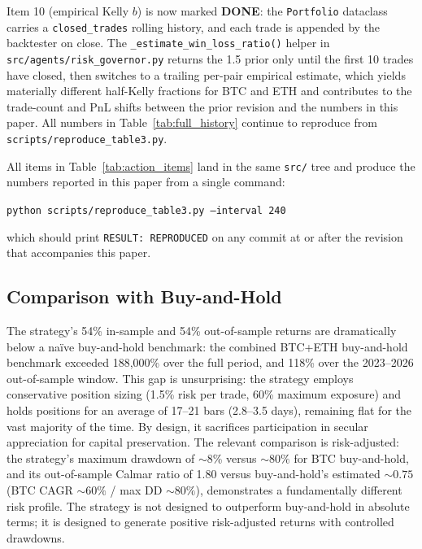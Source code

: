 \documentclass{article}
\begin{document}
Item 10 (empirical Kelly $b$) is now marked \textbf{DONE}: the \texttt{Portfolio} dataclass carries a \texttt{closed\_trades} rolling history, and each trade is appended by the backtester on close. The \texttt{\_estimate\_win\_loss\_ratio()} helper in \texttt{src/agents/risk\_governor.py} returns the 1.5 prior only until the first 10 trades have closed, then switches to a trailing per-pair empirical estimate, which yields materially different half-Kelly fractions for BTC and ETH and contributes to the trade-count and PnL shifts between the prior revision and the numbers in this paper. All numbers in Table~\ref{tab:full_history} continue to reproduce from \texttt{scripts/reproduce\_table3.py}.

All items in Table~\ref{tab:action_items} land in the same \texttt{src/} tree and produce the numbers reported in this paper from a single command:
\begin{center}
\texttt{python scripts/reproduce\_table3.py --interval 240}
\end{center}
which should print \texttt{RESULT: REPRODUCED} on any commit at or after the revision that accompanies this paper.

\subsection{Comparison with Buy-and-Hold}

The strategy's 54\% in-sample and 54\% out-of-sample returns are dramatically below a na\"ive buy-and-hold benchmark: the combined BTC+ETH buy-and-hold benchmark exceeded 188{,}000\% over the full period, and 118\% over the 2023--2026 out-of-sample window.
This gap is unsurprising: the strategy employs conservative position sizing (1.5\% risk per trade, 60\% maximum exposure) and holds positions for an average of 17--21 bars (2.8--3.5 days), remaining flat for the vast majority of the time.
By design, it sacrifices participation in secular appreciation for capital preservation.
The relevant comparison is risk-adjusted: the strategy's maximum drawdown of $\sim$8\% versus ${\sim}80\%$ for BTC buy-and-hold, and its out-of-sample Calmar ratio of 1.80 versus buy-and-hold's estimated ${\sim}0.75$ (BTC CAGR ${\sim}60\%$ / max DD ${\sim}80\%$), demonstrates a fundamentally different risk profile.
The strategy is not designed to outperform buy-and-hold in absolute terms; it is designed to generate positive risk-adjusted returns with controlled drawdowns.

\end{document}
